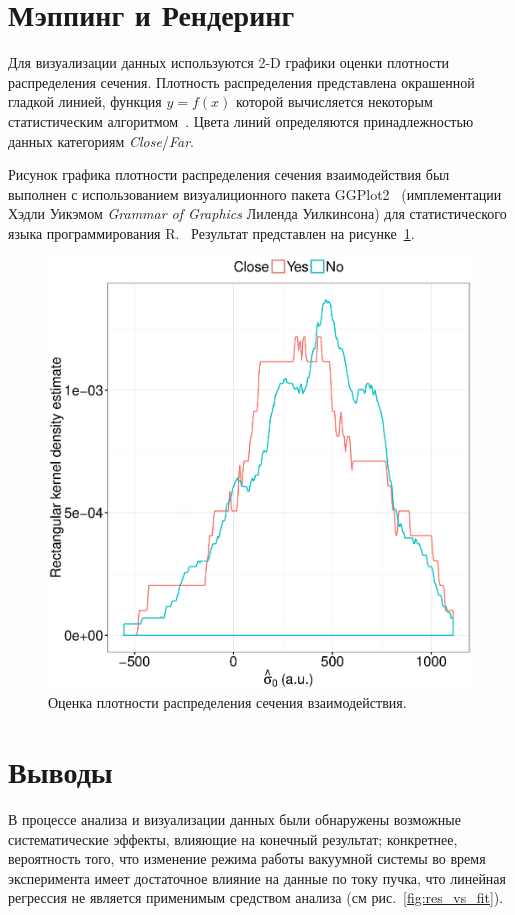 \documentclass{article}
\begin{document}
	\section{Мэппинг и Рендеринг}
	Для визуализации данных используются 2-D графики оценки плотности распределения сечения. Плотность распределения представлена окрашенной гладкой линией, функция $y = f(x)$ которой вычисляется некоторым статистическим алгоритмом~\cite{Density_estimation}. Цвета линий определяются принадлежностью данных категориям \emph{Close}/\emph{Far}.
	
	Рисунок графика плотности распределения сечения взаимодействия был выполнен с использованием визуалиционного пакета GGPlot2~\cite{GGPlot2} (имплементации Хэдли  Уикэмом \emph{Grammar of Graphics} Лиленда Уилкинсона) для статистического языка программирования R.~\cite{GGPLOT2_WIKI} Результат представлен на рисунке~\ref{fig:CS0au_dens}.
	
	\begin{figure}[h!]
		\centering
		\includegraphics[scale=.7]{CS0_au_dens.eps}
		\caption{Оценка плотности распределения сечения взаимодействия.\label{fig:CS0au_dens}}
	\end{figure}

	\section{Выводы}
	В процессе анализа и визуализации данных были обнаружены возможные систематические эффекты, влияющие на конечный результат; конкретнее, вероятность того, что изменение режима работы вакуумной системы во время эксперимента имеет достаточное влияние на данные по току пучка, что линейная регрессия не является применимым средством анализа (см рис.~\ref{fig:res_vs_fit}).
	
\end{document}
